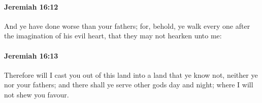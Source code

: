 		\paragraph{Jeremiah 16:12} %
			\label{JEREMIAH-16-12}

			And ye have done worse than your fathers; for, behold, ye walk every one after the imagination of his evil heart, that they may not hearken unto me:


		\paragraph{Jeremiah 16:13} %
			\label{JEREMIAH-16-13}

			Therefore will I cast you out of this land into a land that ye know not, neither ye nor your fathers; and there shall ye serve other gods day and night; where I will not shew you favour.


